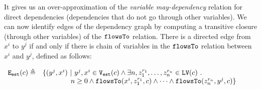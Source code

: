 It gives us an over-approximation of the \emph{variable may-dependency} relation for direct dependencies (dependencies that do not go through other variables).
%
%
We can now identify edges of the dependency graph by computing a transitive closure (through other variables) of the  
 $\mathtt{flowsTo}$ relation. There is a directed edge from  $x^i$ to $y^j$ if and only if there is chain of variables 
    in the $\mathtt{flowsTo}$ relation between $x^i$ and $y^j$, defined as follows:
   \begin{center}
$
\begin{array}{cl}
    \mathtt{{E_{est}}}(c) \triangleq &
    \{ 
    (y^j, x^i)  ~ \vert ~ y^j, x^i \in \mathtt{{V_{est}}}(c)
    \land
      \exists n, z_1^{r_1}, \ldots, z_n^{r_n} \in \mathtt{LV}(c) ~.~ 
    \\ 
    & \qquad \qquad
      n \geq 0 \land
      \mathtt{flowsTo}(x^i,  z_1^{r_1}, c) 
      \land \cdots \land \mathtt{flowsTo}(z_n^{r_n}, y^j, c) 
    \}
    \end{array}
$
\end{center}    
